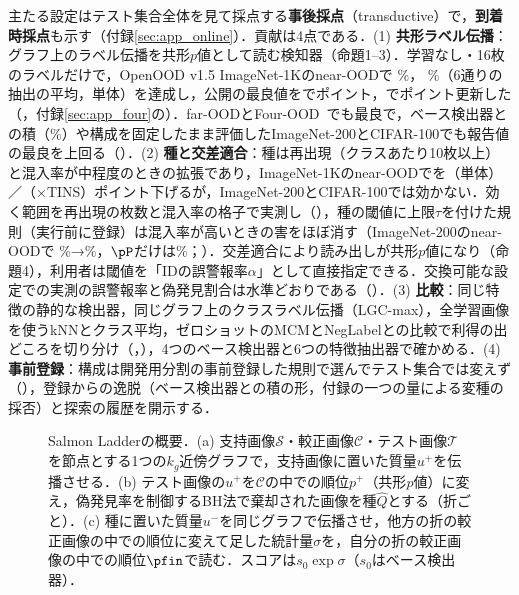 主たる設定はテスト集合全体を見て採点する\textbf{事後採点}（transductive）で，\textbf{到着時採点}も示す（付録\ref{sec:app_online}）．貢献は4点である．(1) \textbf{共形ラベル伝播}：グラフ上のラベル伝播を共形$p$値として読む検知器（命題1--3）．学習なし・16枚のラベルだけで，OpenOOD v1.5 ImageNet-1Kのnear-OODで\AUC{} \NAloneNearAuroc\%，\FPR{} \NAloneNearFpr\%（6通りの抽出の平均，単体）を達成し，公開の最良値を\AUC{}で\NAloneGapNearAuroc{}ポイント，\FPR{}で\NAloneGapNearFpr{}ポイント更新した（，付録\ref{sec:app_four}の）．far-OODとFour-OOD~\cite{huang2021mos}でも最良で，ベース検出器との積（\NNearFpr\%）や構成を固定したまま評価したImageNet-200とCIFAR-100でも報告値の最良を上回る（）．(2) \textbf{種と交差適合}：種は再出現（クラスあたり10枚以上）と混入率が中程度のときの拡張であり，ImageNet-1Kのnear-OODで\FPR{}を\NAloneNearDfprVsLpAbs{}（単体）／\NNearDfprVsLpAbs{}（$\times$TINS）ポイント下げるが，ImageNet-200とCIFAR-100では効かない．効く範囲を再出現の枚数と混入率の格子で実測し（），種の閾値に上限$\tau$を付けた規則（実行前に登録）は混入率が高いときの害をほぼ消す（ImageNet-200のnear-OODで\FPR{} \NInTwoZeroZeroMainNearFpr\%→\NInTwoZeroZeroStoreycNearFpr\%，$\pP$だけは\NInTwoZeroZeroLpNearFpr\%；）．交差適合により読み出しが共形$p$値になり（命題4），利用者は閾値を「IDの誤警報率$\alpha$」として直接指定できる．交換可能な設定での実測の誤警報率と偽発見割合は水準どおりである（）．(3) \textbf{比較}：同じ特徴の静的な検出器，同じグラフ上のクラスラベル伝播（LGC-max），全学習画像を使うkNNとクラス平均，ゼロショットのMCMとNegLabelとの比較で利得の出どころを切り分け（，），4つのベース検出器と6つの特徴抽出器で確かめる．(4) \textbf{事前登録}：構成は開発用分割の事前登録した規則で選んでテスト集合では変えず（），登録からの逸脱（ベース検出器との積の形，付録の一つの量による変種の採否）と探索の履歴を開示する．

\begin{figure}[t]
\centering
\scalebox{0.76}{}
\caption{Salmon Ladderの概要．(a) 支持画像$\mathcal{S}$・較正画像$\mathcal{C}$・テスト画像$\mathcal{T}$を節点とする1つの$k_g$近傍グラフで，支持画像に置いた質量$u^{+}$を伝播させる．(b) テスト画像の$u^{+}$を$\mathcal{C}$の中での順位$p^{+}$（共形$p$値）に変え，偽発見率を制御するBH法で棄却された画像を種$\hat{Q}$とする（折ごと）．(c) 種に置いた質量$u^{-}$を同じグラフで伝播させ，他方の折の較正画像の中での順位に変えて足した統計量$\sigma$を，自分の折の較正画像の中での順位$\pfin$で読む．スコアは$s_0\exp\sigma$（$s_0$はベース検出器）．}
\label{fig:overview}
\end{figure}

